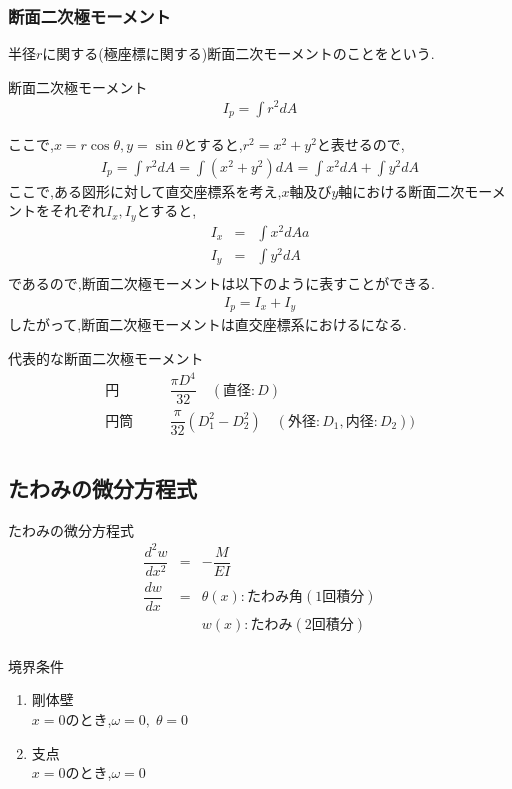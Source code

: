 \documentclass[a4paper]{jsarticle}
\begin{document}
\subsubsection{断面二次極モーメント}
半径$r$に関する(極座標に関する)断面二次モーメントのことをという.
\begin{itembox}[l]{断面二次極モーメント}
    \begin{eqnarray*}
        \displaystyle I_p=\int r^2dA
    \end{eqnarray*}
\end{itembox}
ここで,$x=r\cos\theta,y=\sin\theta$とすると,$r^2=x^2+y^2$と表せるので,
\begin{eqnarray*}
    \displaystyle I_p=\int r^2dA=\int \left(x^2+y^2\right)dA=\int x^2dA+\int y^2dA
\end{eqnarray*}
ここで,ある図形に対して直交座標系を考え,$x$軸及び$y$軸における断面二次モーメントをそれぞれ$I_x,I_y$とすると,
\begin{eqnarray*}
    \displaystyle
    I_x&=&\int x^2dAa\\
    I_y&=&\int y^2dA\\
\end{eqnarray*}
であるので,断面二次極モーメントは以下のように表すことができる.
\begin{eqnarray*}
    I_p=I_x+I_y
\end{eqnarray*}
したがって,断面二次極モーメントは直交座標系におけるになる.\\
\begin{itembox}[l]{代表的な断面二次極モーメント}
    \begin{eqnarray*}
        円\qquad&&\dfrac{\pi D^4}{32}\quad(直径:D)\\
        円筒\quad&&\dfrac{\pi}{32}\left(D_1^2-D_2^2\right)\quad(外径:D_1,内径:D_2))\\
    \end{eqnarray*}
\end{itembox}
\subsection{たわみの微分方程式}
\begin{itembox}[l]{たわみの微分方程式}
    \begin{eqnarray*}
        \dfrac{d^2w}{dx^2}&=&-\dfrac{M}{EI}\\
        \dfrac{dw}{dx}&=&\theta\left(x\right):たわみ角 (1回積分)\\
        &&w\left(x\right):たわみ(2回積分)\\
    \end{eqnarray*}
\end{itembox}
\begin{itembox}[l]{境界条件}
    \begin{enumerate}[(1)]
        \item 剛体壁\\
              $x=0$のとき,\quad$\omega=0,\;\theta=0$
        \item 支点\\
              $x=0$のとき,\quad$\omega=0$
    \end{enumerate}
\end{itembox}
\end{document}
